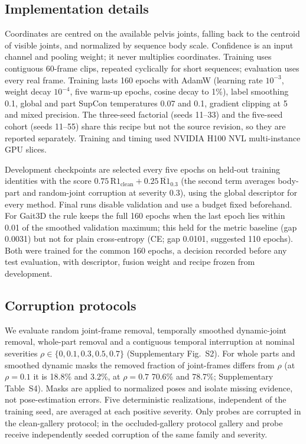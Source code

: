 \documentclass[review,12pt]{elsarticle}
\begin{document}
\subsection{Implementation details}

Coordinates are centred on the available pelvis joints, falling back to the
centroid of visible joints, and normalized by sequence body scale. Confidence is
an input channel and pooling weight; it never multiplies coordinates. Training
uses contiguous 60-frame clips, repeated cyclically for short sequences;
evaluation uses every real frame. Training lasts 160 epochs with AdamW (learning rate $10^{-3}$,
weight decay $10^{-4}$, five warm-up epochs, cosine decay to 1\%), label
smoothing 0.1, global and part SupCon temperatures 0.07 and 0.1, gradient
clipping at 5 and mixed precision. The three-seed
factorial (seeds 11--33) and the five-seed cohort (seeds 11--55) share this
recipe but not the source revision, so they are reported separately. Training
and timing used NVIDIA H100 NVL multi-instance GPU slices.

Development checkpoints are selected every five epochs on held-out training
identities with the score $0.75\,\mathrm{R1}_{\mathrm{clean}} +
0.25\,\overline{\mathrm{R1}}_{0.3}$ (the second term averages body-part and
random-joint corruption at severity 0.3), using the global descriptor for every
method. Final runs disable validation and use a budget fixed beforehand. For
Gait3D the rule keeps the full 160 epochs when the last epoch lies within 0.01
of the smoothed validation maximum; this held for the metric baseline (gap
0.0031) but not for plain cross-entropy (CE; gap 0.0101, suggested 110 epochs).
Both were trained for the common 160 epochs, a decision recorded before any test
evaluation, with descriptor, fusion weight and recipe frozen from development.

\subsection{Corruption protocols}

We evaluate random joint-frame removal, temporally smoothed dynamic-joint
removal, whole-part removal and a contiguous temporal interruption at nominal
severities $\rho\in\{0,0.1,0.3,0.5,0.7\}$ (Supplementary Fig.~S2). For whole parts
and smoothed dynamic masks the removed fraction of joint-frames differs from
$\rho$ (at $\rho=0.1$ it is 18.8\% and 3.2\%, at $\rho=0.7$ 70.6\% and 78.7\%;
Supplementary Table~S4). Masks are applied to normalized poses and isolate
missing evidence, not pose-estimation errors. Five deterministic realizations,
independent of the training seed, are averaged at each positive severity. Only
probes are corrupted in the clean-gallery protocol; in the occluded-gallery
protocol gallery and probe receive independently seeded corruption of the same
family and severity.
\end{document}

